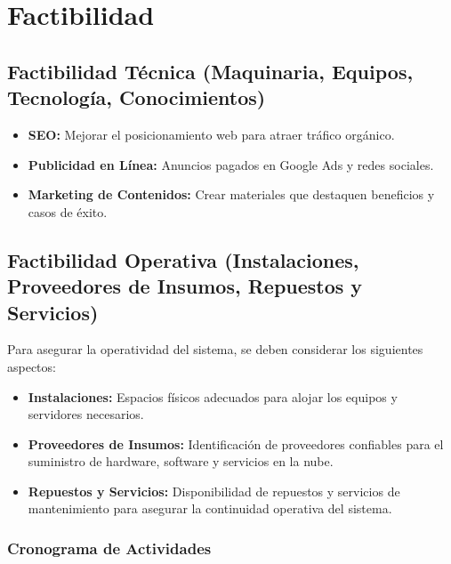 \documentclass[a4paper,12pt]{article}
\begin{document}
\section{Factibilidad}
\subsection{Factibilidad Técnica (Maquinaria, Equipos, Tecnología, Conocimientos)}

\begin{itemize}
    \item \textbf{SEO:} Mejorar el posicionamiento web para atraer tráfico orgánico.
    \item \textbf{Publicidad en Línea:} Anuncios pagados en Google Ads y redes sociales.
    \item \textbf{Marketing de Contenidos:} Crear materiales que destaquen beneficios y casos de éxito.
\end{itemize}

\subsection{Factibilidad Operativa (Instalaciones, Proveedores de Insumos, Repuestos y Servicios)}
Para asegurar la operatividad del sistema, se deben considerar los siguientes aspectos:

\begin{itemize}
    \item \textbf{Instalaciones:} Espacios físicos adecuados para alojar los equipos y servidores necesarios. 
    \item \textbf{Proveedores de Insumos:} Identificación de proveedores confiables para el suministro de hardware, software y servicios en la nube.
    \item \textbf{Repuestos y Servicios:} Disponibilidad de repuestos y servicios de mantenimiento para asegurar la continuidad operativa del sistema.
\end{itemize}

\subsubsection{Cronograma de Actividades}
\end{document}
